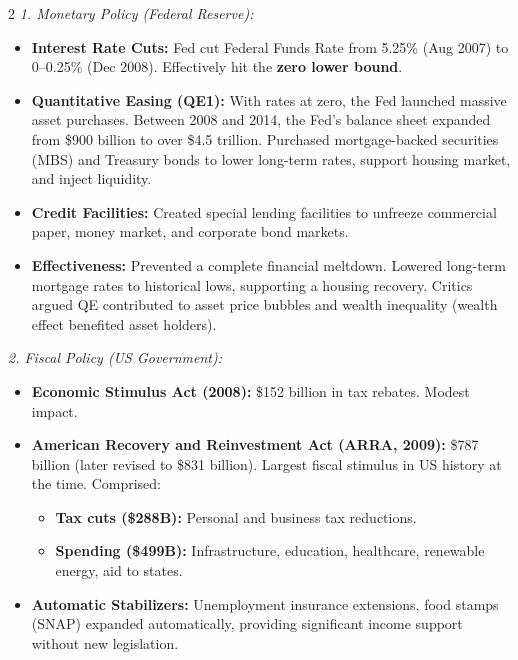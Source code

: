 \documentclass[10pt,a4paper]{article}
\begin{document}
\begin{multicols}{2}
\textit{1. Monetary Policy (Federal Reserve):}
\begin{itemize}[leftmargin=*,nosep]
    \item \textbf{Interest Rate Cuts:} Fed cut Federal Funds Rate from 5.25\% (Aug 2007) to 0--0.25\% (Dec 2008). Effectively hit the \textbf{zero lower bound}.
    \item \textbf{Quantitative Easing (QE1):} With rates at zero, the Fed launched massive asset purchases. Between 2008 and 2014, the Fed's balance sheet expanded from \$900 billion to over \$4.5 trillion. Purchased mortgage-backed securities (MBS) and Treasury bonds to lower long-term rates, support housing market, and inject liquidity.
    \item \textbf{Credit Facilities:} Created special lending facilities to unfreeze commercial paper, money market, and corporate bond markets.
    \item \textbf{Effectiveness:} Prevented a complete financial meltdown. Lowered long-term mortgage rates to historical lows, supporting a housing recovery. Critics argued QE contributed to asset price bubbles and wealth inequality (wealth effect benefited asset holders).
\end{itemize}

\textit{2. Fiscal Policy (US Government):}
\begin{itemize}[leftmargin=*,nosep]
    \item \textbf{Economic Stimulus Act (2008):} \$152 billion in tax rebates. Modest impact.
    \item \textbf{American Recovery and Reinvestment Act (ARRA, 2009):} \$787 billion (later revised to \$831 billion). Largest fiscal stimulus in US history at the time. Comprised:
    \begin{itemize}[nosep]
        \item \textbf{Tax cuts (\$288B):} Personal and business tax reductions.
        \item \textbf{Spending (\$499B):} Infrastructure, education, healthcare, renewable energy, aid to states.
    \end{itemize}
    \item \textbf{Automatic Stabilizers:} Unemployment insurance extensions, food stamps (SNAP) expanded automatically, providing significant income support without new legislation.
\end{itemize}


\end{multicols}
\end{document}
